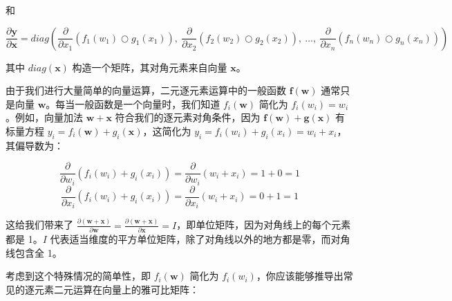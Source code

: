 \documentclass[lang=cn,newtx,10pt,scheme=chinese]{elegantbook}
\begin{document}
和

\[\frac{\partial \mathbf{y}}{\partial \mathbf{x}} = diag \left( \frac{\partial}{\partial x_1}(f_{1}(w_1) \bigcirc g_{1}(x_1)),~ \frac{\partial}{\partial x_2}(f_{2}(w_2) \bigcirc g_{2}(x_2)),~ \ldots,~ \frac{\partial}{\partial x_n}(f_{n}(w_n) \bigcirc g_{n}(x_n)) \right)\]

其中 $diag(\mathbf{x})$ 构造一个矩阵，其对角元素来自向量 $\mathbf{x}$。

由于我们进行大量简单的向量运算，二元逐元素运算中的一般函数 $\mathbf{f(w)}$ 通常只是向量 $\mathbf{w}$。每当一般函数是一个向量时，我们知道 $f_i(\mathbf{w})$ 简化为 $f_i(w_i) = w_i$。例如，向量加法 $\mathbf{w + x}$ 符合我们的逐元素对角条件，因为 $\mathbf{f(w)} + \mathbf{g(x)}$ 有标量方程 $y_i = f_i(\mathbf{w}) + g_i(\mathbf{x})$，这简化为 $y_i = f_i(w_i) + g_i(x_i) = w_i + x_i$，其偏导数为：

\[\frac{\partial}{\partial w_i} ( f_{i}(w_i) + g_{i}(x_i) ) = \frac{\partial}{\partial w_i}(w_i + x_i) = 1 + 0 = 1\]\[\frac{\partial}{\partial x_i} ( f_{i}(w_i) + g_{i}(x_i) ) = \frac{\partial}{\partial x_i}(w_i + x_i) = 0 + 1 = 1\]

这给我们带来了 $\frac{\partial (\mathbf{w+x})}{\partial \mathbf{w}} = \frac{\partial (\mathbf{w+x})}{\partial \mathbf{x}} = I$，即单位矩阵，因为对角线上的每个元素都是 1。$I$ 代表适当维度的平方单位矩阵，除了对角线以外的地方都是零，而对角线包含全 1。

考虑到这个特殊情况的简单性，即 $f_i(\mathbf{w})$ 简化为 $f_i(w_i)$，你应该能够推导出常见的逐元素二元运算在向量上的雅可比矩阵：
\end{document}
